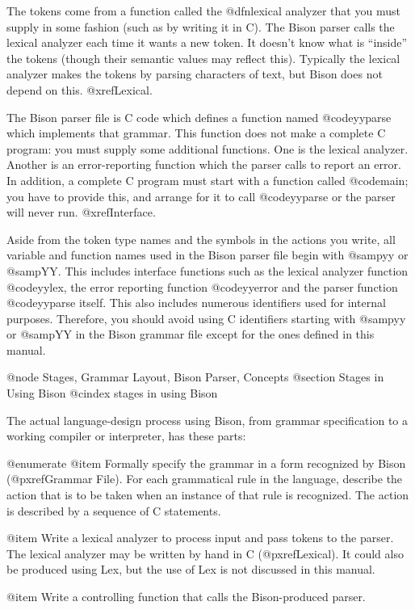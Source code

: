 The tokens come from a function called the @dfn{lexical analyzer} that you
must supply in some fashion (such as by writing it in C).  The Bison parser
calls the lexical analyzer each time it wants a new token.  It doesn't know
what is ``inside'' the tokens (though their semantic values may reflect
this).  Typically the lexical analyzer makes the tokens by parsing
characters of text, but Bison does not depend on this.  @xref{Lexical}.

The Bison parser file is C code which defines a function named
@code{yyparse} which implements that grammar.  This function does not make
a complete C program: you must supply some additional functions.  One is
the lexical analyzer.  Another is an error-reporting function which the
parser calls to report an error.  In addition, a complete C program must
start with a function called @code{main}; you have to provide this, and
arrange for it to call @code{yyparse} or the parser will never run.
@xref{Interface}.

Aside from the token type names and the symbols in the actions you
write, all variable and function names used in the Bison parser file
begin with @samp{yy} or @samp{YY}.  This includes interface functions
such as the lexical analyzer function @code{yylex}, the error reporting
function @code{yyerror} and the parser function @code{yyparse} itself.
This also includes numerous identifiers used for internal purposes.
Therefore, you should avoid using C identifiers starting with @samp{yy}
or @samp{YY} in the Bison grammar file except for the ones defined in
this manual.

@node Stages, Grammar Layout, Bison Parser, Concepts
@section Stages in Using Bison
@cindex stages in using Bison

The actual language-design process using Bison, from grammar specification
to a working compiler or interpreter, has these parts:

@enumerate
@item
Formally specify the grammar in a form recognized by Bison
(@pxref{Grammar File}).  For each grammatical rule in the language,
describe the action that is to be taken when an instance of that rule
is recognized.  The action is described by a sequence of C statements.

@item
Write a lexical analyzer to process input and pass tokens to the
parser.  The lexical analyzer may be written by hand in C
(@pxref{Lexical}).  It could also be produced using Lex, but the use
of Lex is not discussed in this manual.

@item
Write a controlling function that calls the Bison-produced parser.

